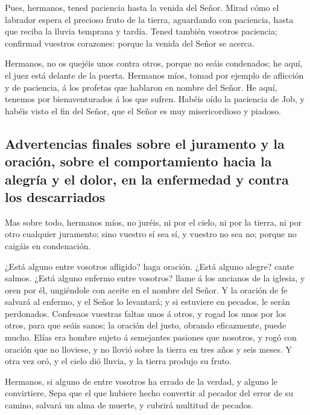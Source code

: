  Pues, hermanos, tened paciencia hasta la venida del Señor.
Mirad cómo el labrador espera el precioso fruto de la tierra, aguardando
con paciencia, hasta que reciba la lluvia temprana y tardía.
 Tened también vosotros paciencia; confirmad vuestros
corazones: porque la venida del Señor se acerca.

 Hermanos, no os quejéis unos contra otros, porque no seáis
condenados; he aquí, el juez está delante de la puerta. 
Hermanos míos, tomad por ejemplo de aflicción y de paciencia, á los
profetas que hablaron en nombre del Señor.  He aquí,
tenemos por bienaventurados á los que sufren. Habéis oído la paciencia
de Job, y habéis visto el fin del Señor, que el Señor es muy
misericordioso y piadoso.

\hypertarget{advertencias-finales-sobre-el-juramento-y-la-oraciuxf3n-sobre-el-comportamiento-hacia-la-alegruxeda-y-el-dolor-en-la-enfermedad-y-contra-los-descarriados}{%
\subsection{Advertencias finales sobre el juramento y la oración, sobre
el comportamiento hacia la alegría y el dolor, en la enfermedad y contra
los
descarriados}\label{advertencias-finales-sobre-el-juramento-y-la-oraciuxf3n-sobre-el-comportamiento-hacia-la-alegruxeda-y-el-dolor-en-la-enfermedad-y-contra-los-descarriados}}

 Mas sobre todo, hermanos míos, no juréis, ni por el cielo,
ni por la tierra, ni por otro cualquier juramento; sino vuestro sí sea
sí, y vuestro no sea no; porque no caigáis en condenación.

 ¿Está alguno entre vosotros afligido? haga oración. ¿Está
alguno alegre? cante salmos.  ¿Está alguno enfermo entre
vosotros? llame á los ancianos de la iglesia, y oren por él, ungiéndole
con aceite en el nombre del Señor.  Y la oración de fe
salvará al enfermo, y el Señor lo levantará; y si estuviere en pecados,
le serán perdonados.  Confesaos vuestras faltas unos á
otros, y rogad los unos por los otros, para que seáis sanos; la oración
del justo, obrando eficazmente, puede mucho.  Elías era
hombre sujeto á semejantes pasiones que nosotros, y rogó con oración que
no lloviese, y no llovió sobre la tierra en tres años y seis meses.
 Y otra vez oró, y el cielo dió lluvia, y la tierra produjo
su fruto.

 Hermanos, si alguno de entre vosotros ha errado de la
verdad, y alguno le convirtiere,  Sepa que el que hubiere
hecho convertir al pecador del error de su camino, salvará un alma de
muerte, y cubrirá multitud de pecados.
